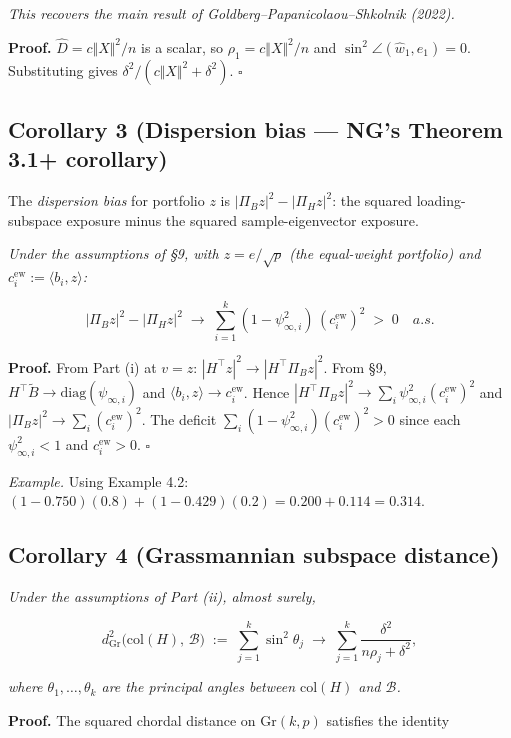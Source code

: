 \documentclass{article}
\theoremstyle{remark}
\begin{document}
\textit{This recovers the main result of Goldberg–Papanicolaou–Shkolnik (2022).}

\textbf{Proof.} $\hat{D} = c\Vert X\Vert^2/n$ is a scalar, so $\rho_1 = c\Vert X\Vert^2/n$ and $\sin^2\angle(\hat{w}_1,e_1) = 0$. Substituting gives $\delta^2/(c\Vert X\Vert^2+\delta^2)$. $\square$

\subsection{Corollary 3 (Dispersion bias — NG's Theorem 3.1+ corollary)}

The \textit{dispersion bias} for portfolio $z$ is $|\Pi_B z|^2 - |\Pi_H z|^2$: the squared loading-subspace exposure minus the squared sample-eigenvector exposure.

\textit{Under the assumptions of §9, with $z = e/\sqrt{p}$ (the equal-weight portfolio) and $c_i^{\mathrm{ew}} := \langle b_i, z\rangle$:}

\[
|\Pi_B z|^2 - |\Pi_H z|^2 \;\to\; \sum_{i=1}^k (1-\psi_{\infty,i}^2)\,(c_i^{\mathrm{ew}})^2 \;>\; 0 \quad a.s.
\]

\textbf{Proof.} From Part (i) at $v = z$: $|H^\top z|^2\to|H^\top\Pi_B z|^2$. From §9, $H^\top\tilde{B}\to\mathrm{diag}(\psi_{\infty,i})$ and $\langle b_i, z\rangle \to c_i^{\mathrm{ew}}$. Hence $|H^\top\Pi_B z|^2\to\sum_i\psi_{\infty,i}^2 (c_i^{\mathrm{ew}})^2$ and $|\Pi_B z|^2\to\sum_i(c_i^{\mathrm{ew}})^2$. The deficit $\sum_i(1-\psi_{\infty,i}^2)(c_i^{\mathrm{ew}})^2 > 0$ since each $\psi_{\infty,i}^2 < 1$ and $c_i^{\mathrm{ew}} > 0$. $\square$

\textit{Example.} Using Example 4.2: $(1-0.750)(0.8) + (1-0.429)(0.2) = 0.200 + 0.114 = 0.314$.

\subsection{Corollary 4 (Grassmannian subspace distance)}

\textit{Under the assumptions of Part (ii), almost surely,}

\[
d_{\mathrm{Gr}}^2\bigl(\mathrm{col}(H),\,\mathcal{B}\bigr) \;:=\; \sum_{j=1}^k \sin^2\theta_j \;\longrightarrow\; \sum_{j=1}^k \frac{\delta^2}{n\rho_j + \delta^2},
\]

\textit{where $\theta_1, \ldots, \theta_k$ are the principal angles between $\mathrm{col}(H)$ and $\mathcal{B}$.}

\textbf{Proof.} The squared chordal distance on $\mathrm{Gr}(k,p)$ satisfies the identity
\end{document}
